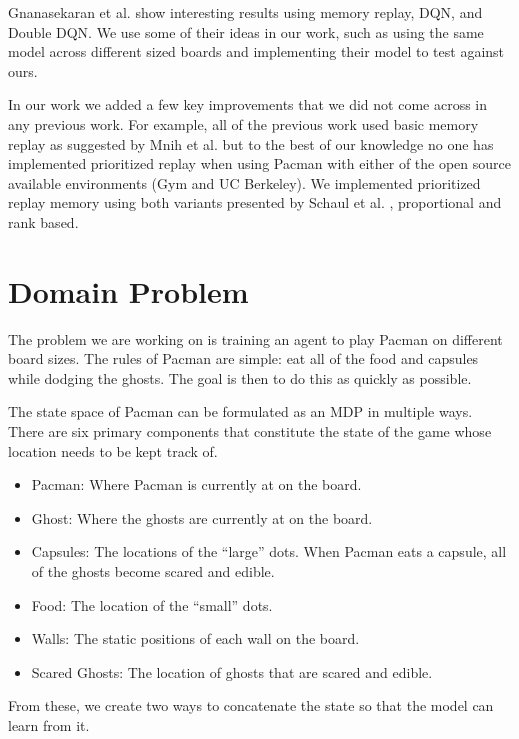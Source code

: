 \documentclass[conference]{IEEEtran}
\begin{document}
Gnanasekaran et al. \cite{Abeynaya2017} show interesting results using memory replay, DQN, and Double DQN. We use some of their ideas in our work,  such as using the same model across different sized boards and implementing their model to test against ours.

In our work we added a few key improvements that we did not come across in any previous work. For example, all of the previous work used basic memory replay as suggested by Mnih et al. \cite{Mnih2015} but to the best of our knowledge no one has implemented prioritized replay when using Pacman with either of the open source available environments (Gym and UC Berkeley). We implemented prioritized replay memory using both variants presented by Schaul et al. \cite{schaul2016prioritized}, proportional and rank based.


\section{Domain Problem} \label{sect:domain}

The problem we are working on is training an agent to play Pacman on different board sizes. The rules of Pacman are simple: eat all of the food and capsules while dodging the ghosts. The goal is then to do this as quickly as possible.

The state space of Pacman can be formulated as an MDP in multiple ways. There are six primary components that constitute the state of the game whose location needs to be kept track of.

\begin{itemize}
    \item Pacman: Where Pacman is currently at on the board.
    \item Ghost: Where the ghosts are currently at on the board.
    \item Capsules: The locations of the ``large'' dots. When Pacman eats a capsule, all of the ghosts become scared and edible.
    \item Food: The location of the ``small'' dots.
    \item Walls: The static positions of each wall on the board.
    \item Scared Ghosts: The location of ghosts that are scared and edible.
\end{itemize}

From these, we create two ways to concatenate the state so that the model can learn from it.
\end{document}
